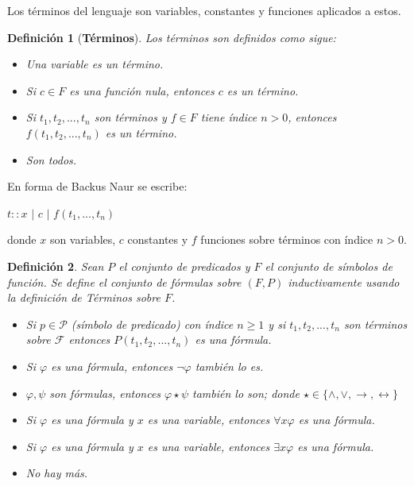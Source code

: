 \documentclass[letterpaper,12pt]{article}
\newtheorem{define}{Definición}[]
\begin{document}
    Los términos del lenguaje son variables, constantes y funciones aplicados a 
    estos.
    \begin{define}[\textbf{Términos}]
      Los términos son definidos como sigue:
      \begin{itemize}
        \item Una variable es un término.
        \item Si $c \in F$ es una función nula, entonces $c$ es un término.
        \item Si $t_{1}, t_{2}, ..., t_{n}$ son términos y $f \in F$ tiene
        índice $n > 0$, entonces $f(t_{1}, t_{2}, ..., t_{n})$ es un término.
        \item Son todos.
      \end{itemize}
    \end{define}
    
    En forma de Backus Naur se escribe:
    \begin{center}
      $t :: x$ $|$ $c$ $|$ $f(t_{1},...,t_{n})$
    \end{center}
    
    donde $x$ son variables, $c$ constantes y $f$ funciones sobre términos con 
    índice $n > 0$.
    
    \begin{define}
      Sean $P$ el conjunto de predicados y $F$ el conjunto de símbolos de
      función. Se define el conjunto de fórmulas sobre $(F, P)$ inductivamente 
      usando la definición de Términos sobre $F$.
      \begin{itemize}
        \item Si $p \in \mathcal{P}$ (símbolo de predicado) con índice 
        $n \geq 1$ y si $t_{1}, t_{2}, ..., t_{n}$ son términos sobre 
        $\mathcal{F}$ entonces $P(t_{1}, t_{2},..., t_{n})$ es una fórmula. 
        \item Si $\varphi$ es una fórmula, entonces $\neg \varphi$ también 
        lo es.
        \item $\varphi, \psi$ son fórmulas, entonces $\varphi \star \psi$ 
        también lo son; donde 
        $\star \in \{ \land, \lor, \rightarrow, \leftrightarrow \}$ 
        \item Si $\varphi$ es una fórmula y $x$ es una variable, entonces 
        $\forall x \varphi$ es una fórmula.
        \item Si $\varphi$ es una fórmula y $x$ es una variable, entonces 
        $\exists x \varphi$ es una fórmula.
        \item No hay más.
      \end{itemize}
    
    \end{define}
    
\end{document}
